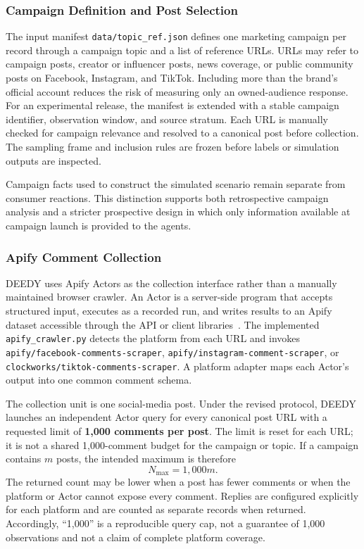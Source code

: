 \documentclass[conference]{IEEEtran}
\begin{document}
\subsubsection{Campaign Definition and Post Selection}

The input manifest \texttt{data/topic\_ref.json} defines one marketing campaign
per record through a campaign topic and a list of reference URLs. URLs may
refer to campaign posts, creator or influencer posts, news coverage, or public
community posts on Facebook, Instagram, and TikTok. Including more than the
brand's official account reduces the risk of measuring only an owned-audience
response. For an experimental release, the manifest is extended with a stable
campaign identifier, observation window, and source stratum. Each URL is
manually checked for campaign relevance and resolved to a canonical post before
collection. The sampling frame and inclusion rules are frozen before labels or
simulation outputs are inspected.

Campaign facts used to construct the simulated scenario remain separate from
consumer reactions. This distinction supports both retrospective campaign
analysis and a stricter prospective design in which only information available
at campaign launch is provided to the agents.

\subsubsection{Apify Comment Collection}
\label{sec:apify-collection}

DEEDY uses Apify Actors as the collection interface rather than a manually
maintained browser crawler. An Actor is a server-side program that accepts
structured input, executes as a recorded run, and writes results to an Apify
dataset accessible through the API or client libraries~\cite{apify2026actors}.
The implemented \texttt{apify\_crawler.py} detects the platform from each URL
and invokes \texttt{apify/facebook-comments-scraper},
\texttt{apify/instagram-comment-scraper}, or
\texttt{clockworks/tiktok-comments-scraper}. A platform adapter maps each
Actor's output into one common comment schema.

The collection unit is one social-media post. Under the revised protocol,
DEEDY launches an independent Actor query for every canonical post URL with a
requested limit of
\textbf{1,000 comments per post}. The limit is reset for each URL; it is not a
shared 1,000-comment budget for the campaign or topic. If a campaign contains
$m$ posts, the intended maximum is therefore
\begin{equation}
    N_{\max}=1{,}000m.
\end{equation}
The returned count may be lower when a post has fewer comments or when the
platform or Actor cannot expose every comment. Replies are configured
explicitly for each platform and are counted as separate records when returned.
Accordingly, ``1,000'' is a reproducible query cap, not a guarantee of 1,000
observations and not a claim of complete platform coverage.
\end{document}
